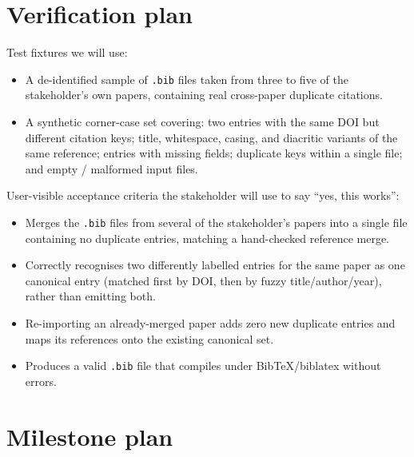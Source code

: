 \documentclass[11pt,a4paper]{article}
\begin{document}
\section{Verification plan}

Test fixtures we will use:

\begin{itemize}[nosep]
  \item A de-identified sample of \texttt{.bib} files taken from three to
        five of the stakeholder's own papers, containing real
        cross-paper duplicate citations.
  \item A synthetic corner-case set covering: two entries with the same DOI
        but different citation keys; title, whitespace, casing, and
        diacritic variants of the same reference; entries with missing
        fields; duplicate keys within a single file; and empty / malformed
        input files.
\end{itemize}

User-visible acceptance criteria the stakeholder will use to say
``yes, this works'':

\begin{itemize}[nosep]
  \item Merges the \texttt{.bib} files from several of the stakeholder's
        papers into a single file containing no duplicate entries, matching
        a hand-checked reference merge.
  \item Correctly recognises two differently labelled entries for the same
        paper as one canonical entry (matched first by DOI, then by fuzzy
        title/author/year), rather than emitting both.
  \item Re-importing an already-merged paper adds zero new duplicate
        entries and maps its references onto the existing canonical set.
  \item Produces a valid \texttt{.bib} file that compiles under
        BibTeX/biblatex without errors.
\end{itemize}

\section{Milestone plan}
\end{document}
